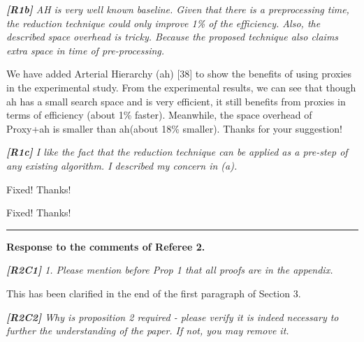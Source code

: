 \documentclass[11pt]{letter}
\newcommand{\vs}{\vspace{1ex}}
\newcommand{\svs}{\vspace{0.36ex}}
\newcommand{\ah}{{\sc ah}\xspace}
\begin{document}
\noindent
{\em
{\bf [R1b]}   AH is very well known baseline. Given that there is a preprocessing time, the reduction technique could only improve 1\% of the efficiency. Also, the described space overhead is tricky. Because the proposed technique also claims extra space in time of pre-processing.}
\svs

We have added Arterial Hierarchy (\ah) [38] to show the benefits of using proxies in the experimental study.  From the experimental results, we can see that though \ah has a small search space and is very efficient, it still benefits from proxies in terms of efficiency (about 1\% faster). Meanwhile, the space overhead of Proxy+\ah is smaller than \ah (about 18\% smaller). Thanks for your suggestion!


\noindent
{\em{\bf[R1c]} I like the fact that the reduction technique can be applied as a pre-step of any existing algorithm. I described my concern in (a).}
\svs



\svs



\svs


\svs

Fixed! Thanks!

\svs


Fixed! Thanks!



\vspace{2.8ex}
\hrule
\vspace{0.6ex}
{\bf Response to the comments of Referee 2.}



\vs
\noindent
{\em
{\bf [R2C1]}
1. Please mention before Prop 1 that all proofs are in the appendix.}
\svs

This has been clarified in the end of the first paragraph of Section 3.

\vs
\noindent
{\em
{\bf [R2C2]} Why is proposition 2 required - please verify it is indeed necessary to further the understanding of the paper. If not, you may remove it.}
\svs
\end{document}
